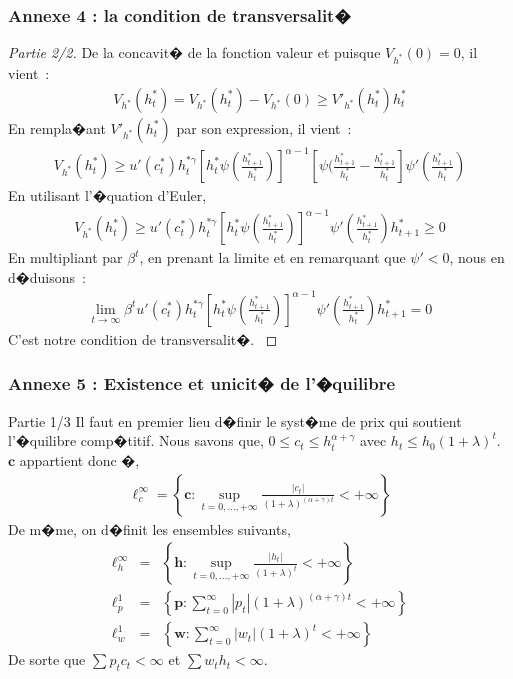 \documentclass[10pt, hyperref={pdfpagemode=FullScreen}]{beamer} %
\begin{document}
\begin{frame}\label{annexe4part2}
\frametitle{Annexe 4 : la condition de transversalit�}
\begin{proof}[Partie 2/2]
\scriptsize{
De la concavit� de la fonction valeur et puisque $V_{h^{*}}(0)=0$, il vient~: 
\begin{eqnarray*}
V_{h^{*}}(h_{t}^{*}) = V_{h^{*}}(h_{t}^{*}) - V_{h^{*}}(0) \geq V'_{h^{*}}(h_{t}^{*})h_{t}^{*}
\end{eqnarray*}
En rempla�ant $V'_{h^{*}}(h_{t}^{*})$ par son expression, il vient~: 
\begin{eqnarray*}
V_{h^{*}}(h_{t}^{*}) \geq u'(c_{t}^{*})h_{t}^{*\gamma}[h_{t}^{*}\psi(\frac{h_{t+1}^{*}}{h_{t}^{*}})]^{\alpha-1}[\psi(\frac{h_{t+1}^{*}}{h_{t}^{*}}-\frac{h_{t+1}^{*}}{h_{t}^{*}}]\psi'(\frac{h_{t+1}^{*}}{h_{t}^{*}})
\end{eqnarray*}
En utilisant l'�quation d'Euler,
\begin{eqnarray*}
V_{h^{*}}(h_{t}^{*}) \geq u'(c_{t}^{*})h_{t}^{*\gamma}[h_{t}^{*}\psi(\frac{h_{t+1}^{*}}{h_{t}^{*}})]^{\alpha-1} \psi'(\frac{h_{t+1}^{*}}{h_{t}^{*}})h_{t+1}^{*} \geq 0
\end{eqnarray*}
En multipliant par $\beta^{t}$, en prenant la limite et en remarquant que $\psi'<0$, nous en d�duisons~: 
\begin{eqnarray*}
\lim_{t\rightarrow \infty} \beta^{t}u'(c_{t}^{*})h_{t}^{*\gamma}[h_{t}^{*}\psi(\frac{h_{t+1}^{*}}{h_{t}^{*}})]^{\alpha-1} \psi'(\frac{h_{t+1}^{*}}{h_{t}^{*}})h_{t+1}^{*} = 0
\end{eqnarray*}
C'est notre condition de transversalit�.
}
\end{proof}
\end{frame}




\begin{frame}\label{annexe5part1}
\frametitle{Annexe 5 : Existence et unicit� de l'�quilibre}
\begin{block}{Partie 1/3}
\scriptsize{
Il faut en premier lieu d�finir le syst�me de prix qui soutient l'�quilibre comp�titif. Nous savons que, $0\leq c_{t} \leq h_{t}^{\alpha+\gamma}$ avec $h_{t}\leq h_{0}(1+\lambda)^{t}$. $\mathbf{c}$ appartient donc �,
\begin{eqnarray*}
\ell_{c}^{\infty} = \left\{\mathbf{c} : \sup_{t=0,\ldots,+\infty} \frac{|c_{t}|}{(1+\lambda)^{(\alpha+\gamma)t}}<+\infty\right\}
\end{eqnarray*}
De m�me, on d�finit les ensembles suivants,
\begin{eqnarray*}
\ell_{h}^{\infty} &=& \left\{\mathbf{h} : \sup_{t=0,\ldots,+\infty} \frac{|h_{t}|}{(1+\lambda)^{t}}<+\infty\right\} \\
\ell_{p}^{1} &=& \left\{\mathbf{p} : \sum_{t=0}^{\infty}|p_{t}|(1+\lambda)^{(\alpha+\gamma)t}<+\infty\right\} \\
\ell_{w}^{1} &=& \left\{\mathbf{w} : \sum_{t=0}^{\infty}|w_{t}|(1+\lambda)^{t}<+\infty\right\} 
\end{eqnarray*}
De sorte que $\sum p_{t}c_{t}<\infty$ et $\sum w_{t}h_{t}<\infty$. 
}
\end{block}
\end{frame}
\end{document}
